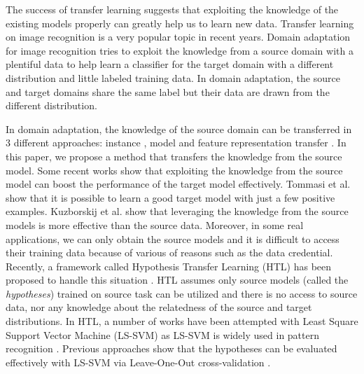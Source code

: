 The success of transfer learning suggests that exploiting the knowledge of the existing models properly can greatly help us to learn new data. 
Transfer learning on image recognition is a very popular topic in recent years. Domain adaptation for image recognition tries to exploit the knowledge from a source domain with a plentiful data to help learn a classifier for the target domain with a different distribution and little labeled training data. In domain adaptation, the source and target domains share the same label but their data are drawn from the different distribution.

In domain adaptation, the knowledge of the source domain can be transferred in 3 different approaches: instance , model and feature representation transfer \cite{pan2010survey}. In this paper, we propose a method that transfers the knowledge from the source model. Some recent works show that exploiting the knowledge from the source model can boost the performance of the target model effectively. Tommasi et al. \cite{tommasi2014learning} show that it is possible to learn a good target model with just a few positive examples. Kuzborskij et al.\cite{kuzborskij2013n} show that leveraging the knowledge from the source models is more effective than the source data.
Moreover, in some real applications, we can only obtain the source models and it is difficult to access their training data because of various of reasons such as the data credential.   
Recently, a framework called Hypothesis Transfer Learning (HTL) has been proposed to handle this situation \cite{kuzborskij2013stability}. HTL assumes only source models (called the \textit{hypotheses}) trained on source task can be utilized and there is no access to source data, nor any knowledge about the relatedness of the source and target distributions. 
In HTL, a number of works have been attempted with Least Square Support Vector Machine (LS-SVM) as LS-SVM is widely used in pattern recognition \cite{bishop2006pattern}. Previous approaches show that the hypotheses can be evaluated effectively with LS-SVM via Leave-One-Out cross-validation \cite{tommasi2014learning}.

